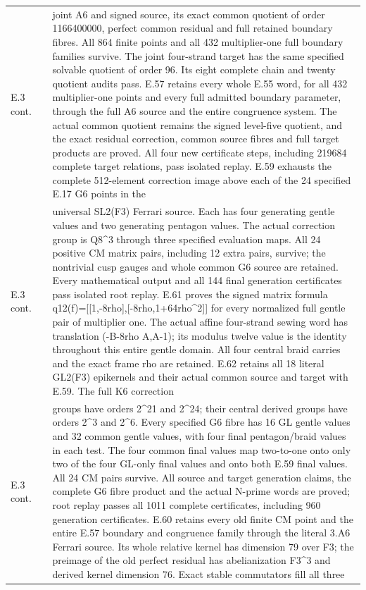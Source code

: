 \begin{longtable}{@{}p{1.1cm}p{3.0cm}p{10.3cm}@{}}
E.3 cont. &  & joint A6 and signed source, its exact common quotient of order 1166400000, perfect common residual and full retained boundary fibres. All 864 finite points and all 432 multiplier-one full boundary families survive. The joint four-strand target has the same specified solvable quotient of order 96. Its eight complete chain and twenty quotient audits pass. E.57 retains every whole E.55 word, for all 432 multiplier-one points and every full admitted boundary parameter, through the full A6 source and the entire congruence system. The actual common quotient remains the signed level-five quotient, and the exact residual correction, common source fibres and full target products are proved. All four new certificate steps, including 219684 complete target relations, pass isolated replay. E.59 exhausts the complete 512-element correction image above each of the 24 specified E.17 G6 points in the  \\
E.3 cont. &  & universal SL2(F3) Ferrari source. Each has four generating gentle values and two generating pentagon values. The actual correction group is Q8\textasciicircum{}3 through three specified evaluation maps. All 24 positive CM matrix pairs, including 12 extra pairs, survive; the nontrivial cusp gauges and whole common G6 source are retained. Every mathematical output and all 144 final generation certificates pass isolated root replay. E.61 proves the signed matrix formula q12(f)=[[1,-8rho],[-8rho,1+64rho\textasciicircum{}2]] for every normalized full gentle pair of multiplier one. The actual affine four-strand sewing word has translation (-B-8rho A,A-1); its modulus twelve value is the identity throughout this entire gentle domain. All four central braid carries and the exact frame rho are retained. E.62 retains all 18 literal GL2(F3) epikernels and their actual common source and target with E.59. The full K6 correction  \\
E.3 cont. &  & groups have orders 2\textasciicircum{}21 and 2\textasciicircum{}24; their central derived groups have orders 2\textasciicircum{}3 and 2\textasciicircum{}6. Every specified G6 fibre has 16 GL gentle values and 32 common gentle values, with four final pentagon/braid values in each test. The four common final values map two-to-one onto only two of the four GL-only final values and onto both E.59 final values. All 24 CM pairs survive. All source and target generation claims, the complete G6 fibre product and the actual N-prime words are proved; root replay passes all 1011 complete certificates, including 960 generation certificates. E.60 retains every old finite CM point and the entire E.57 boundary and congruence family through the literal 3.A6 Ferrari source. Its whole relative kernel has dimension 79 over F3; the preimage of the old perfect residual has abelianization F3\textasciicircum{}3 and derived kernel dimension 76. Exact stable commutators fill all three  \\

\end{longtable}

